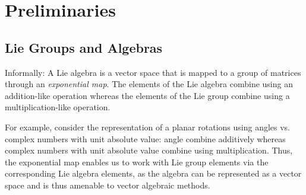 \section{Preliminaries}

\subsection{Lie Groups and Algebras}

Informally: A Lie algebra is a vector space that is mapped to a group of matrices through an \emph{exponential map}. The elements of the Lie algebra combine using an addition-like operation whereas the elements of the Lie group combine using a multiplication-like operation.

For example, consider the representation of a planar rotations using angles vs. complex numbers with unit absolute value: angle combine additively whereas complex numbers with unit absolute value combine using multiplication. Thus, the exponential map enables us to work with Lie group elements via the corresponding Lie algebra elements, as the algebra can be represented as a vector space and is thus amenable to vector algebraic methods.


